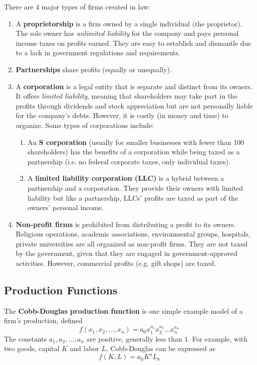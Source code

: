 \documentclass{article}
\begin{document}
  \begin{definition}
    There are 4 major types of firms created in law: 
    \begin{enumerate}
      \item A \textbf{proprietorship} is a firm owned by a single individual (the proprietor). The sole owner has \textit{unlimited liability} for the company and pays personal income taxes on profits earned. They are easy to establish and dismantle due to a lack in government regulations and requirements. 
      \item \textbf{Partnerships} share profits (equally or unequally). 
      \item A \textbf{corporation} is a legal entity that is separate and distinct from its owners. It offers \textit{limited liability}, meaning that shareholders may take part in the profits through dividends and stock appreciation but are not personally liable for the company's debts. However, it is costly (in money and time) to organize. Some types of corporations include: 
      \begin{enumerate}
        \item An \textbf{S corporation} (usually for smaller businesses with fewer than 100 shareholders) has the benefits of a corporation while being taxed as a partnership (i.e. no federal corporate taxes, only individual taxes). 
        \item A \textbf{limited liability corporation (LLC)} is a hybrid between a partnership and a corporation. They provide their owners with limited liability but like a partnership, LLCs' profits are taxed as part of the owners' personal income. 
      \end{enumerate}
      \item \textbf{Non-profit firms} is prohibited from distributing a profit to its owners. Religious operations, academic associations, environmental groups, hospitals, private universities are all organized as non-profit firms. They are not taxed by the government, given that they are engaged in government-approved activities. However, commercial profits (e.g. gift shops) are taxed. 
    \end{enumerate}
  \end{definition}

  \subsection{Production Functions}

    \begin{definition}
      The \textbf{Cobb-Douglas production function} is one simple example model of a firm's production, defined 
      \[f(x_1, x_2, \ldots, x_n) = a_0 x_1^{a_1} x_2^{a_2} \ldots x_n^{a_n}\]
      The constants $a_1, a_2, \ldots, a_n$ are positive, generally less than $1$. For example, with two goods, capital $K$ and labor $L$, Cobb-Douglas can be expressed as 
      \[f(K, L) = a_0 K^a L_b\]
    \end{definition}
\end{document}
